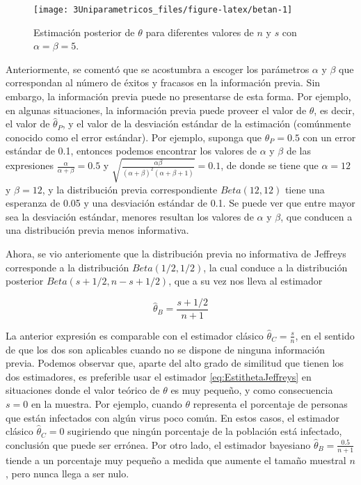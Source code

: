 \documentclass[
  10pt,
  spanish,
]{book}
\theoremstyle{definition}
\theoremstyle{definition}
\theoremstyle{definition}
\theoremstyle{definition}
\theoremstyle{remark}
\begin{document}
\begin{figure}

{\centering \texttt{[image: 3Uniparametricos\_files/figure-latex/betan-1]} 

}

\caption{Estimación posterior de $\theta$ para diferentes valores de $n$ y $s$ con $\alpha=\beta=5$.}\label{fig:betan}
\end{figure}

Anteriormente, se comentó que se acostumbra a escoger los parámetros
\(\alpha\) y \(\beta\) que correspondan al número de éxitos y fracasos en la
información previa. Sin embargo, la información previa puede no
presentarse de esta forma. Por ejemplo, en algunas situaciones, la
información previa puede proveer el valor de \(\theta\), es decir, el
valor de \(\hat{\theta}_P\), y el valor de la desviación estándar de la
estimación (comúnmente conocido como el error estándar). Por ejemplo,
suponga que \(\hat{\theta}_P=0.5\) con un error estándar de 0.1, entonces
podemos encontrar los valores de \(\alpha\) y \(\beta\) de las expresiones
\(\frac{\alpha}{\alpha+\beta}=0.5\) y
\(\sqrt{\frac{\alpha\beta}{(\alpha+\beta)^2(\alpha+\beta+1)}}=0.1\), de
donde se tiene que \(\alpha=12\) y \(\beta=12\), y la distribución previa
correspondiente \(Beta(12, 12)\) tiene una esperanza de 0.05 y una
desviación estándar de 0.1. Se puede ver que entre mayor sea la
desviación estándar, menores resultan los valores de \(\alpha\) y \(\beta\),
que conducen a una distribución previa menos informativa.

Ahora, se vio anteriomente que la distribución previa no informativa de
Jeffreys corresponde a la distribución \(Beta(1/2, 1/2)\), la cual conduce
a la distribución posterior \(Beta(s+1/2, n-s+1/2)\), que a su vez nos
lleva al estimador

\begin{equation}
\label{eq:EstithetaJeffreys}
\hat{\theta}_B=\frac{s+1/2}{n+1}
\end{equation}

La anterior expresión es comparable con el estimador clásico
\(\hat{\theta}_C=\frac{s}{n}\), en el sentido de que los dos son
aplicables cuando no se dispone de ninguna información previa. Podemos
observar que, aparte del alto grado de similitud que tienen los dos
estimadores, es preferible usar el estimador \eqref{eq:EstithetaJeffreys} en situaciones donde el valor teórico de \(\theta\) es muy pequeño, y
como consecuencia \(s=0\) en la muestra. Por ejemplo, cuando \(\theta\)
representa el porcentaje de personas que están infectados con algún
virus poco común. En estos casos, el estimador clásico
\(\hat{\theta}_C=0\) sugiriendo que ningún porcentaje de la población está
infectado, conclusión que puede ser errónea. Por otro lado, el estimador
bayesiano \(\hat{\theta}_B=\frac{0.5}{n+1}\) tiende a un porcentaje muy pequeño a medida que aumente el tamaño muestral \(n\),
pero nunca llega a ser nulo.
\end{document}
